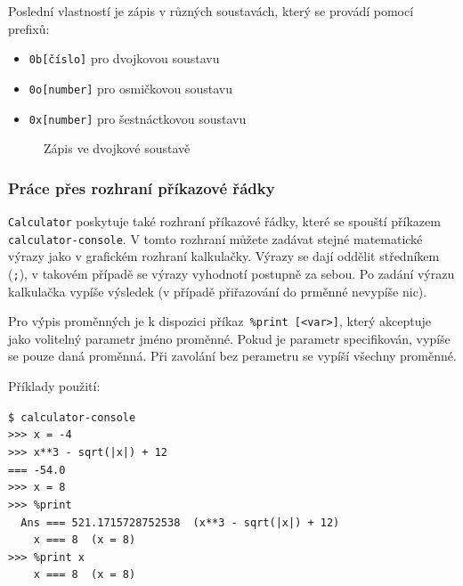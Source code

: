 \documentclass[a4paper, 11pt]{article}
\begin{document}
\noindent
Poslední vlastností je zápis v různých soustavách, který se provádí pomocí
prefixů:
\begin{itemize}
    \item \texttt{0b{[}číslo{]}} pro dvojkovou soustavu
    \item \texttt{0o{[}number{]}} pro osmičkovou soustavu
    \item \texttt{0x{[}number{]}} pro šestnáctkovou soustavu
\end{itemize}

\begin{figure}[H]
    \centering
    \caption{Zápis ve dvojkové soustavě}
\end{figure}

\subsubsection{Práce přes rozhraní příkazové řádky}
\texttt{Calculator} poskytuje také rozhraní příkazové řádky, které se spouští příkazem\texttt{ calculator-console}.
V tomto rozhraní můžete zadávat stejné matematické výrazy jako v grafickém rozhraní kalkulačky. Výrazy se dají oddělit středníkem (\texttt{;}), v takovém případě se výrazy vyhodnotí postupně za sebou. Po zadání výrazu kalkulačka vypíše výsledek (v případě přiřazování do prměnné nevypíše nic).

Pro výpis proměnných je k dispozici příkaz\texttt{ \%print [<var>]}, který akceptuje jako volitelný parametr jméno proměnné. Pokud je parametr specifikován, vypíše se pouze daná proměnná. Při zavolání bez perametru se vypíší všechny proměnné.
\vspace{0.5cm}

\noindent
Příklady použití:

\noindent\texttt{\$ calculator-console} \\
\texttt{>>> x = -4} \\
\texttt{>>> x**3 - sqrt(|x|) + 12} \\
\texttt{=== -54.0} \\[0.5cm]
\texttt{>>> x = 8} \\
\texttt{>>> \%print} \\
\texttt{\-\ \ Ans === 521.1715728752538 \ (x**3 - sqrt(|x|) + 12)} \\
\texttt{\-\ \ \ \ x === 8 \ (x = 8)} \\[0.5cm]
\texttt{>>> \%print x} \\
\texttt{\-\ \ \ \ x === 8 \ (x = 8)} \\[0.5cm]
\end{document}
